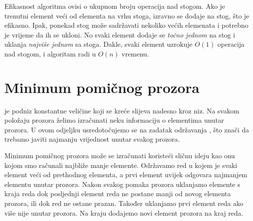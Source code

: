 \begin{center}
\end{center}

Efikasnost algoritma ovisi o
ukupnom broju operacija nad stogom.
Ako je trenutni element veći od
elementa na vrhu stoga, izravno se
dodaje na stog, što je efikasno.
Ipak, ponekad stog može sadržavati nekoliko
većih elemenata i potrebno je vrijeme da ih se ukloni.
No svaki element dodaje se \emph{točno jednom} na stog
i uklanja \emph{najviše jednom} sa stoga.
Dakle, svaki element uzrokuje $O(1)$ operacija nad stogom,
i algoritam radi u $O(n)$ vremenu.

\section{Minimum pomičnog prozora}


 je podniz konstantne veličine
koji se kreće slijeva nadesno kroz niz.
Na svakom položaju prozora
želimo izračunati neku informaciju
o elementima unutar prozora.
U ovom odjeljku usredotočujemo se na zadatak
održavanja ,
što znači da
trebamo javiti najmanju vrijednost unutar svakog prozora.

Minimum pomičnog prozora može se izračunati
koristeći sličnu ideju kao onu kojom smo računali
najbliže manje elemente.
Održavamo red
u kojem je svaki element veći od
prethodnog elementa,
a prvi element
uvijek odgovara najmanjem elementu unutar prozora.
Nakon svakog pomaka prozora
uklanjamo elemente s kraja reda
dok posljednji element reda
ne postane manji od novog elementa prozora,
ili dok red ne ostane prazan.
Također uklanjamo prvi element reda
ako više nije unutar prozora.
Na kraju dodajemo novi element prozora
na kraj reda.

